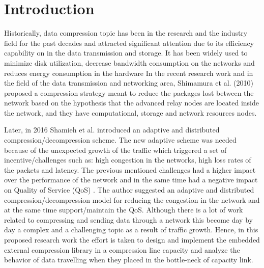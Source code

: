 \documentclass[sigconf]{acmart}
\begin{document}
\section{Introduction}
Historically, data compression \cite{lelewer1987data} topic has been in the research and the industry field for the past decades and attracted significant attention due to its efficiency capability on in the data transmission and storage. It has been widely used to minimize disk utilization, decrease bandwidth consumption on the networks and reduces energy consumption in the hardware \cite{welton2011improving}
In the recent research work and in the field of the data transmission and networking area, Shimamura et al. (2010) proposed a compression strategy meant to reduce the packages lost between the network based on the hypothesis that the advanced relay nodes are located inside the network, and they have computational, storage and network resources nodes\cite{shimamura2010compressing}. 

Later, in 2016 Shamieh et al. \cite{shamieh2016adaptive} introduced  an adaptive and distributed compression/decompression scheme. The new adaptive scheme was needed because of the unexpected growth of the traffic which triggered a set of incentive/challenges such as: high congestion in the networks, high loss rates of the packets and latency. The previous mentioned challenges had a higher impact over the performance of the network and in the same time had a negative impact on Quality of Service (QoS) . The author suggested an adaptive and distributed compression/decompression model for reducing the congestion in the network and at the same time support/maintain the QoS.
Although there is a lot of work related to compressing and sending data through a network \cite{serfozo1999little}\cite{shimamura2010compressing}\cite{tan2010enhanced} this become day by day a complex and a challenging topic as a result of traffic growth. 
Hence, in this proposed research work the effort is taken to design and implement the embedded external compression library in a compression line capacity and analyze the behavior of data travelling when they placed in the bottle-neck of capacity link. 
\end{document}
